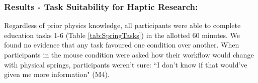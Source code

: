 
\subsubsection{Results - Task Suitability for Haptic Research:}


Regardless of prior physics knowledge, all participants were able to complete education tasks 1-6 (Table \ref{tab:SpringTasks}) in the allotted 60 minutes. 
We found no evidence that any task favoured %
one condition over another.
When participants in the mouse condition were asked how their workflow would change %
with physical springs, participants weren't sure: ``I don't know if that would've given me more information" (M4). 
 
